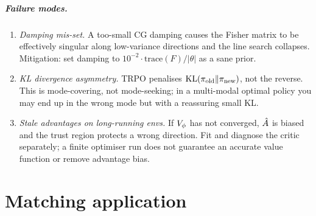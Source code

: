 \documentclass[11pt,oneside]{scrbook}
\begin{document}
\begin{safetyangle}
\paragraph{Failure modes.}
\begin{enumerate}[leftmargin=*]
  \item \emph{Damping mis-set.} A too-small CG damping causes the Fisher matrix to be effectively singular along low-variance directions and the line search collapses. Mitigation: set damping to $10^{-2} \cdot \mathrm{trace}(F)/|\theta|$ as a sane prior.
  \item \emph{KL divergence asymmetry.} TRPO penalises $\mathrm{KL}(\pi_\text{old}\|\pi_\text{new})$, not the reverse. This is mode-covering, not mode-seeking; in a multi-modal optimal policy you may end up in the wrong mode but with a reassuring small KL.
  \item \emph{Stale advantages on long-running envs.} If $V_\phi$ has not converged, $\hat{A}$ is biased and the trust region protects a wrong direction. Fit and diagnose the critic separately; a finite optimiser run does not
guarantee an accurate value function or remove advantage bias.
\end{enumerate}
\end{safetyangle}

\chapter{Matching application}
\end{document}
